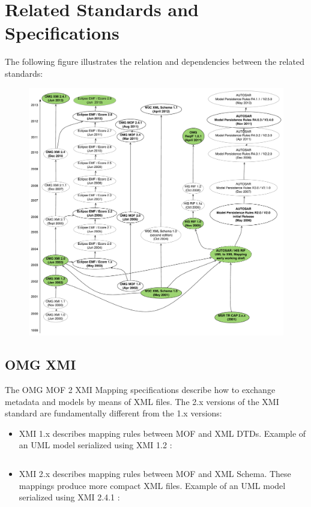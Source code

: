 \documentclass[11pt,a4paper]{article}
\begin{document}
\section{Related Standards and Specifications}
The following figure illustrates the relation and dependencies between the related standards:
\begin{figure}
\centering
\includegraphics[width=\textwidth]{images/XMLPersistenceMapping_RelatedStandards.pdf}
\end{figure}

\subsection{OMG XMI}
The OMG MOF 2 XMI Mapping specifications describe how to exchange metadata and models by means of XML files. The 2.x versions of the XMI standard are fundamentally different from the 1.x versions:
\begin{itemize}
\item XMI 1.x describes mapping rules between MOF and XML DTDs. Example of an UML model serialized using XMI 1.2 \cite{omg:xmi12}:
\inputminted[fontsize=\footnotesize, tabsize=2]{xml}{examples/XMI12_Example.xml}

\item XMI 2.x describes mapping rules between MOF and XML Schema. These mappings produce more compact XML files. Example of an UML model serialized using XMI 2.4.1 \cite{omg:xmi241}:
\inputminted[fontsize=\footnotesize, tabsize=2]{xml}{examples/XMI241_Example.xml}
\end{itemize} 
\end{document}
